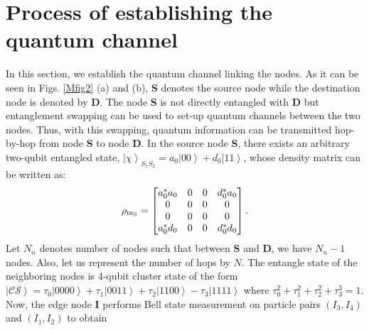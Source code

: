 \documentclass[aps,pra,twocolumn,showpacs,superscriptaddress,groupedaddress]{revtex4}
\begin{document}
\section{Process of establishing the quantum channel}
In this section, we establish the quantum channel linking the nodes. As it can be seen in Figs. \ref{Mfig2} (a) and (b), {\bf S} denotes the source node while the destination node is denoted by {\bf D}. The node  {\bf S} is not directly entangled with {\bf D} but entanglement swapping can be used to set-up quantum channels between the two nodes. Thus, with this swapping, quantum information can be transmitted hop-by-hop from node  {\bf S} to node {\bf D}. In the source node {\bf S}, there exists an arbitrary two-qubit entangled state, $\left|\chi\right\rangle_{S_1S_2}=a_0\left|00\right\rangle+d_0\left|11\right\rangle$, whose density matrix can be written as:
\begin{equation}
\rho_{\rm in_S}=\left[\begin{matrix}a_0^*a_0&0&0&d_0^*a_0\\
                                        0&0&0&0\\
                                        0&0&0&0\\
                                  a_0^*d_0&0&0&d_0^*d_0
																	\end{matrix}\right].
\label{SUS1}
\end{equation}
Let $N_n$ denotes number of nodes such that between {\bf S} and {\bf D}, we have $N_n-1$ nodes. Also, let us represent the number of hops by $N$. The entangle state of the neighboring nodes is 4-qubit cluster state of the form $\left|\mathcal{CS}\right\rangle=\tau_0\left|0000\right\rangle+\tau_1\left|0011\right\rangle+\tau_2\left|1100\right\rangle-\tau_3\left|1111\right\rangle$ where $\tau_0^2+\tau_1^2+\tau_2^2+\tau_3^3=1$. Now, the edge node {\bf I} performs Bell state measurement on particle pairs $(I_3,I_4)$ and $(I_1,I_2)$ to obtain
\end{document}
